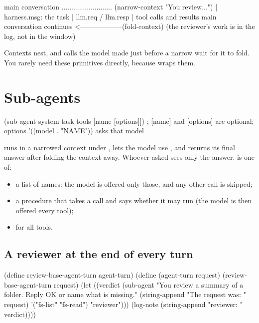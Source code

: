 \begin{txt}
   main conversation ..........................   (narrow-context "You review...")
                                                   | harness.msg: the task
                                                   | llm.req / llm.resp
                                                   | tool calls and results
   main conversation continues  <------------------(fold-context)
   (the reviewer's work is in the log, not in the window)
\end{txt}

Contexts nest, and calls the model made just before a narrow wait for it
to fold. You rarely need these primitives directly, because
 wraps them.

\section{Sub-agents}

\begin{txt}
(sub-agent system task tools [name [options]]) ; [name] and [options] are optional; options '((model . "NAME")) asks that model
\end{txt}

runs  in a narrowed context under , lets the model
use , and returns its final answer after folding the context
away. Whoever asked sees only the answer.  is one of:

\begin{itemize}
  \item a list of names: the model is offered only those, and any other
    call is skipped;
  \item a procedure that takes a call and says whether it may run (the
    model is then offered every tool);
  \item {} for all tools.
\end{itemize}

\subsection{A reviewer at the end of every turn}

\begin{scm}
(define review-base-agent-turn agent-turn)
(define (agent-turn request)
  (review-base-agent-turn request)
  (let ((verdict (sub-agent "You review a summary of a folder. Reply OK or name what is missing."
                            (string-append "The request was: " request)
                            '("fs-list" "fs-read")
                            "reviewer")))
    (log-note (string-append "reviewer: " verdict))))
\end{scm}

